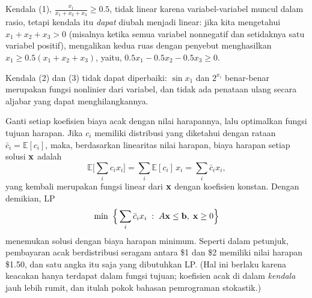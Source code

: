 Kendala (1), $\frac{x_1}{x_1 + x_2 + x_3} \geq 0.5$, tidak linear karena variabel-variabel muncul dalam rasio, tetapi kendala itu \emph{dapat} diubah menjadi linear: jika kita mengetahui $x_1 + x_2 + x_3 > 0$ (misalnya ketika semua variabel nonnegatif dan setidaknya satu variabel positif), mengalikan kedua ruas dengan penyebut menghasilkan $x_1 \geq 0.5(x_1 + x_2 + x_3)$, yaitu, $0.5x_1 - 0.5x_2 - 0.5x_3 \geq 0$.

Kendala (2) dan (3) tidak dapat diperbaiki: $\sin x_1$ dan $2^{x_i}$ benar-benar merupakan fungsi nonlinier dari variabel, dan tidak ada penataan ulang secara aljabar yang dapat menghilangkannya.


Ganti setiap koefisien biaya acak dengan nilai harapannya, lalu optimalkan fungsi tujuan harapan. Jika $c_i$ memiliki distribusi yang diketahui dengan rataan $\bar{c}_i = \mathbb{E}[c_i]$, maka, berdasarkan linearitas nilai harapan, biaya harapan setiap solusi $\mathbf{x}$ adalah
\[
\mathbb{E}\Big[\sum_i c_i x_i\Big] = \sum_i \mathbb{E}[c_i]\, x_i = \sum_i \bar{c}_i x_i ,
\]
yang kembali merupakan fungsi linear dari $\mathbf{x}$ dengan koefisien konstan. Dengan demikian, LP
\[
\min\ \Big\{ \sum_i \bar{c}_i x_i \; : \; A\mathbf{x} \leq \mathbf{b}, \; \mathbf{x} \geq 0 \Big\}
\]
menemukan solusi dengan biaya harapan minimum. Seperti dalam petunjuk, pembayaran acak berdistribusi seragam antara \$1 dan \$2 memiliki nilai harapan \$1.50, dan satu angka itu saja yang dibutuhkan LP. (Hal ini berlaku karena keacakan hanya terdapat dalam fungsi tujuan; koefisien acak di dalam \emph{kendala} jauh lebih rumit, dan itulah pokok bahasan pemrograman stokastik.)



